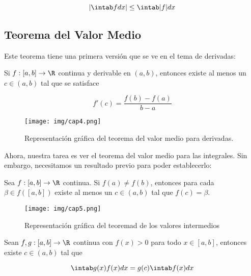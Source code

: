 \[
\left| \intab fdx \right| \leq \intab |f|dx
\]

\subsection{Teorema del Valor Medio}

Este teorema tiene una primera versión que se ve en el tema de derivadas:

\begin{teo}
    Si $f: [a,b] \rightarrow \R$ continua y derivable en $(a,b)$, entonces existe al menos un $c \in (a,b)$ tal que se satisface
    
    \[
    f'(c) = \frac{f(b) -f(a)}{b-a}
    \]
\end{teo}

\begin{figure}
    \centering
    \texttt{[image: img/cap4.png]}
    \caption{\footnotesize Representación gráfica del teorema del valor medio para derivadas.}
    \label{fig:tvmd}
\end{figure}

Ahora, nuestra tarea es ver el teorema del valor medio para las integrales. Sin embargo, necesitamos un resultado previo para poder establecerlo:

\begin{teo}
    Sea $f: [a,b] \rightarrow \R$ continua. Si $f(a) \neq f(b)$, entonces para cada $\beta \in f([a,b])$ existe al menos un $c \in (a,b)$ tal que $f(c) = \beta$.
\end{teo}

\begin{figure}
    \centering
    \texttt{[image: img/cap5.png]}
    \caption{\footnotesize Representación gráfica del teoremad de los valores intermedios}
    \label{fig:tvi}
\end{figure}


\begin{teo}
    Sean $f,g: [a,b] \rightarrow \R$ continua con $f(x) > 0$ para todo $x \in [a,b]$, entonces existe $c \in (a,b)$ tal que
    
    \[
    \intab g(x)f(x)dx = g(c)\intab f(x)dx
    \]
\end{teo}

